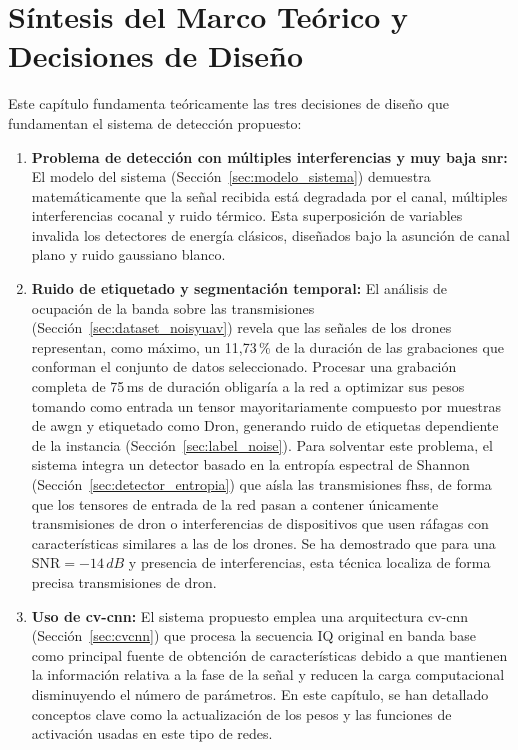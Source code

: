 \section{Síntesis del Marco Teórico y Decisiones de Diseño}
\label{sec:sintesis_cap3}

Este capítulo fundamenta teóricamente las tres decisiones de diseño que fundamentan el sistema de detección propuesto:

\begin{enumerate}
    \item \textbf{Problema de detección con múltiples interferencias y muy baja \gls{snr}:} El modelo del sistema (Sección~\ref{sec:modelo_sistema}) demuestra matemáticamente que la señal recibida está degradada por el canal, múltiples interferencias cocanal y ruido térmico. Esta superposición de variables invalida los detectores de energía clásicos, diseñados bajo la asunción de canal plano y ruido gaussiano blanco.

    \item \textbf{Ruido de etiquetado y segmentación temporal:} El análisis de ocupación de la banda sobre las transmisiones (Sección~\ref{sec:dataset_noisyuav}) revela que las señales de los drones representan, como máximo, un 11,73\,\% de la duración de las grabaciones que conforman el conjunto de datos seleccionado. Procesar una grabación completa de 75\,ms de duración obligaría a la red a optimizar sus pesos tomando como entrada un tensor mayoritariamente compuesto por muestras de \gls{awgn} y etiquetado como Dron, generando ruido de etiquetas dependiente de la instancia (Sección~\ref{sec:label_noise}). Para solventar este problema, el sistema integra un detector basado en la entropía espectral de Shannon (Sección~\ref{sec:detector_entropia}) que aísla las transmisiones \gls{fhss}, de forma que los tensores de entrada de la red pasan a contener únicamente transmisiones de dron o interferencias de dispositivos que usen ráfagas con características similares a las de los drones. Se ha demostrado que para una $\text{SNR} = -14\,dB$ y presencia de interferencias, esta técnica localiza de forma precisa transmisiones de dron.

    \item \textbf{Uso de \gls{cv-cnn}:} El sistema propuesto emplea una arquitectura \gls{cv-cnn} (Sección~\ref{sec:cvcnn}) que procesa la secuencia IQ original en banda base como principal fuente de obtención de características debido a que mantienen la información relativa a la fase de la señal y reducen la carga computacional disminuyendo el número de parámetros. En este capítulo, se han detallado conceptos clave como la actualización de los pesos y las funciones de activación usadas en este tipo de redes.
\end{enumerate}